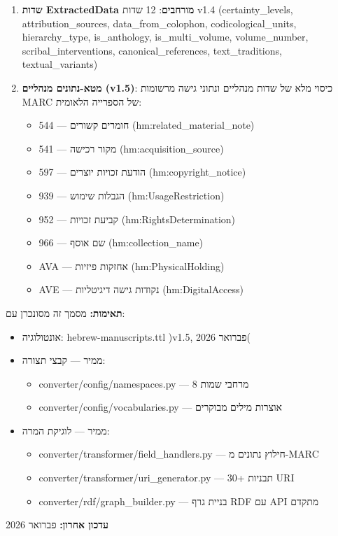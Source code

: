 \documentclass[12pt,a4paper]{article}
\begin{document}
\begin{enumerate}
\item \textbf{שדות ExtractedData מורחבים}: 12 שדות v1.4 \textenglish{(certainty\_levels, attribution\_sources, data\_from\_colophon, codicological\_units, hierarchy\_type, is\_anthology, is\_multi\_volume, volume\_number, scribal\_interventions, canonical\_references, text\_traditions, textual\_variants)}
\item \textbf{מטא-נתונים מנהליים \textenglish{(v1.5)}}: כיסוי מלא של שדות מנהליים ונתוני גישה מרשומות \textenglish{MARC} של הספרייה הלאומית:
  \begin{itemize}
  \item \textenglish{544} — חומרים קשורים \textenglish{(hm:related\_material\_note)}
  \item \textenglish{541} — מקור רכישה \textenglish{(hm:acquisition\_source)}
  \item \textenglish{597} — הודעת זכויות יוצרים \textenglish{(hm:copyright\_notice)}
  \item \textenglish{939} — הגבלות שימוש \textenglish{(hm:UsageRestriction)}
  \item \textenglish{952} — קביעת זכויות \textenglish{(hm:RightsDetermination)}
  \item \textenglish{966} — שם אוסף \textenglish{(hm:collection\_name)}
  \item \textenglish{AVA} — אחזקות פיזיות \textenglish{(hm:PhysicalHolding)}
  \item \textenglish{AVE} — נקודות גישה דיגיטליות \textenglish{(hm:DigitalAccess)}
  \end{itemize}
\end{enumerate}

\textbf{תאימות:} מסמך זה מסונכרן עם:
\begin{itemize}
\item אונטולוגיה: \textenglish{hebrew-manuscripts.ttl} )v1.5, פברואר 2026(
\item ממיר — קבצי תצורה:
  \begin{itemize}
  \item \textenglish{converter/config/namespaces.py} — 8 מרחבי שמות
  \item \textenglish{converter/config/vocabularies.py} — אוצרות מילים מבוקרים
  \end{itemize}
\item ממיר — לוגיקת המרה:
  \begin{itemize}
  \item \textenglish{converter/transformer/field\_handlers.py} — חילוץ נתונים מ-MARC
  \item \textenglish{converter/transformer/uri\_generator.py} — 30+ תבניות URI
  \item \textenglish{converter/rdf/graph\_builder.py} — בניית גרף RDF עם API מתקדם
  \end{itemize}
\end{itemize}

\textbf{עדכון אחרון:} פברואר 2026
\end{document}

